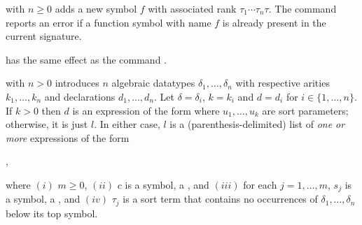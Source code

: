 \begin{description}
\smallskip

%
\item[\expr{(declare-fun $f$ ($\tau_1$ $\cdots$ $\tau_n$) $\tau$)}]
with $n \geq 0$ adds a new symbol $f$ 
with associated rank $\tau_1\cdots\tau_n\tau$.
The command reports an error if a function symbol with name $f$ 
is already present in the current signature.
\smallskip

%
\item[\expr{(declare-const $f$ $\tau$)}]
has the same effect as the command .
\smallskip


%
\item[%
\expr{(declare-datatypes (($\delta_1$ $k_1$) $\cdots$ ($\delta_n$ $k_n$))
                         ($d_1$ $\cdots$ $d_n$))}]
with $n > 0$ introduces $n$ algebraic datatypes $\delta_1,\dots,\delta_n$
with respective arities $k_1,\dots,k_n$ and declarations $d_1,\dots,d_n$. 
Let $\delta = \delta_i$, $k = k_i$ and $d = d_i$ for $i \in \{1,\ldots,n\}$.
If $k >0$ then $d$ is an expression of the form 
where $u_1, \ldots, u_k$ are sort parameters;
otherwise, it is just $l$. 
In either case, $l$ is a (parenthesis-delimited) list of \emph{one or more} 
expressions of the form
%
\begin{center}
 ,
\end{center}
where 
$(i)$ $m \geq 0$, 
$(ii)$ $c$ is a symbol, a , and 
$(iii)$ for each $j=1,\ldots,m$, $s_j$ is a symbol, a , and 
$(iv)$ $\tau_j$ is a sort term
that contains no occurrences of $\delta_1, \ldots, \delta_n$ below its top symbol.


\end{description}
